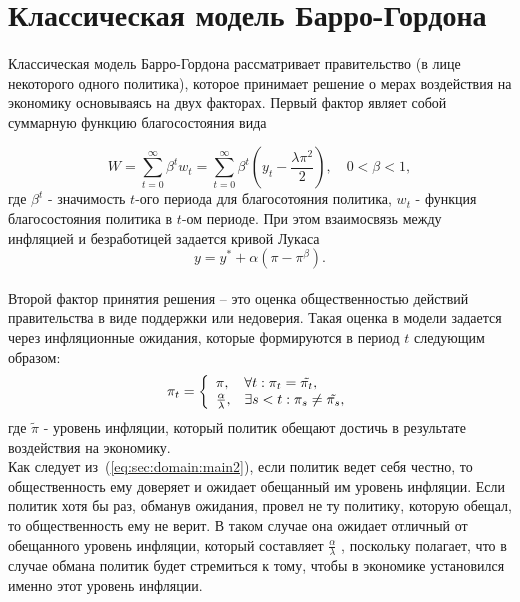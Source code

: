 \section{Классическая модель Барро-Гордона}
\label{sec:domain}

\paragraph{} Классическая модель Барро-Гордона рассматривает правительство (в лице некоторого одного политика), которое принимает решение о мерах воздействия на экономику основываясь на двух факторах. Первый фактор являет собой суммарную функцию благосостояния вида

\begin{equation}
 \label{eq:sec:domain:main}
W=\sum_{t=0}^{\infty}\beta^t w_t = \sum_{t=0}^{\infty}\beta^t\left(y_t-\frac{\lambda\pi^2}{2}\right), \quad 0<\beta<1,
\end{equation}
где $\beta^t$ - значимость $t$-ого периода для благосотояния политика, $w_t$ - функция благосостояния политика в $t$-ом периоде. При этом взаимосвязь между инфляцией и безработицей задается кривой Лукаса
\begin{equation}
	\label{eq:sec:domain:main1}
	y=y^*+\alpha(\pi-\pi^\beta).
\end{equation}\\
Второй фактор принятия решения -- это оценка общественностью действий правительства в виде поддержки или недоверия. Такая оценка в модели задается через инфляционные ожидания, которые формируются в период $t$ следующим образом:
\begin{equation}
\label{eq:sec:domain:main2}
\pi_t = \left\{  \begin{array}{l l}
{\pi}, & \forall t:\pi_t=\tilde{\pi_t}, \\ 
\frac{\alpha}{\lambda}, & \exists s < t : \pi_s \ne \tilde{\pi_s},
\end{array} \right. 
\end{equation}
где $\tilde{\pi}$ - уровень инфляции, который политик обещают достичь в результате воздействия на экономику.
\\

Как следует из~(\ref{eq:sec:domain:main2}), если политик ведет себя честно, то общественность ему доверяет и ожидает обещанный им уровень инфляции. Если политик хотя бы раз, обманув ожидания, провел не ту политику, которую обещал, то общественность ему не верит. В таком случае она ожидает отличный от обещанного уровень инфляции, который составляет $\frac{\alpha}{\lambda}$ , поскольку полагает, что в случае обмана политик будет стремиться к тому, чтобы в экономике установился именно этот уровень инфляции.
\\

